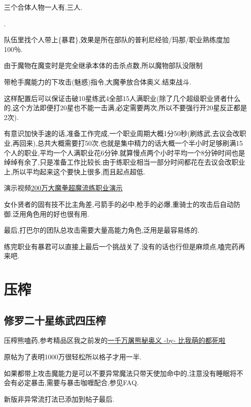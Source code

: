 		三个合体人物一人有{},三人{}.

		{\color{red}{四人放到普利尼部队}}.

		队伍里找个人带上{\color{red}{普利尼教育员}}\{暴君\},效果是所在部队的普利尼经验/玛那/职业熟练度加100％.

		由于魔物在魔变时是完全继承本体的击杀点数,所以魔物部队没限制

		带枪手魔能力的下攻击(魅惑)指令,大魔拳放合体奥义.结束战斗.

		这样配置后可以保证击破10星练武4全部15人满职业(除了几个超级职业贤者什么的,这个方法即便打20星也不能一击满,必定需要两次,所以不要强行开20星反正都是2次).

		有意识加快手速的话,准备工作完成,一个职业周期大概1分50秒(刷练武,去议会改职业,再回来),总共大概需要打50次.也就是集中精力的话大概一个半小时足够刷满15个人的职业,平均一个人满职业花6分钟.就算慢点两个小时平均一个8分钟时间也是绰绰有余了,只是准备工作比较长.由于练职业相当一部分时间都花在去议会改职业上,所以平均起来这个要快上很多,而且起点超低.

		演示视频\href{http://www.bilibili.com/video/av2966618/}{200万大魔拳超魔流练职业演示}

		女仆贤者的固有技不比主角差,弓箭手的必中,枪手的必爆,重骑士的攻击后自动防御.泛用角色用的好也很有用.

		最后,打巴尔的团队总攻击需要大量高能力角色,泛用是最容易练的.

		练完职业有暴君可以直接上最后一个挑战关了.没有的话也行但是麻烦点,嗑完药再来吧.

	\newpage

	\section{压榨}

		\subsection{修罗二十星练武四压榨}

		压榨熊嗑药,参考精品区我之前发的\href{http://tieba.baidu.com/p/3825275063}{一千万屠熊秘奥义 -by- 比我萌的都死啦}

		原帖为了表明1000万很轻松所以格子才用一半.

		如果都带上攻击魔能力是可以不要异常魔法只带天使加命中的,注意没有睡眠将不会有必定暴击,需要与暴击咖喱配合,参见FAQ.

		新版非异常流打法已添加到帖子最后.

